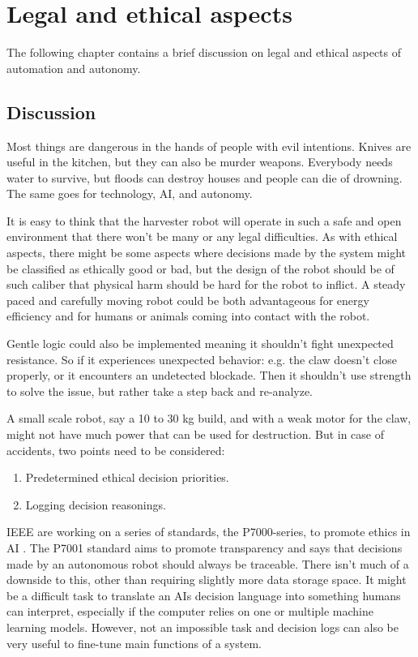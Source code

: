 \documentclass[%
oneside,    %
project,    %
nosummary   %
]{USN-MSc}
\begin{document}
\chapter{Legal and ethical aspects}
\label{ch:legal}
The following chapter contains a brief discussion on legal and ethical aspects of automation and autonomy.

\section{Discussion}
\label{sec:legalEthicalAspects}

Most things are dangerous in the hands of people with evil intentions. Knives are useful in the kitchen,
but they can also be murder weapons. Everybody needs water to survive, but floods can destroy houses and people can die of drowning.
The same goes for technology, AI, and autonomy.

It is easy to think that the harvester robot will operate in such a safe and open environment that there won't be many or any legal difficulties.
As with ethical aspects, there might be some aspects where decisions made by the system might be classified as ethically good or bad,
but the design of the robot should be of such caliber that physical harm should be hard for the robot to inflict. 
A steady paced and carefully moving robot could be both advantageous for energy efficiency and for humans or animals coming into contact with the robot.

Gentle logic could also be implemented meaning it shouldn't fight unexpected resistance. 
So if it experiences unexpected behavior: e.g. the claw doesn't close properly, or it encounters an undetected blockade.
Then it shouldn't use strength to solve the issue, but rather take a step back and re-analyze.

A small scale robot, say a 10 to 30 kg build, and with a weak motor for the claw, might not have much power that can be used for destruction. 
But in case of accidents, two points need to be considered: 
\begin{enumerate}
  \item Predetermined ethical decision priorities.
  \item Logging decision reasonings.
\end{enumerate}

IEEE are working on a series of standards, the P7000-series, to promote ethics in AI \cite{7924235}. 
The P7001 standard aims to promote transparency and says that decisions made by an autonomous robot should always be traceable. There isn't much of a downside to this, other than requiring slightly more data storage space. It might be a difficult task to translate an AIs decision language into something humans can interpret, especially if the computer relies on one or multiple machine learning models. However, not an impossible task and decision logs can also be very useful to fine-tune main functions of a system.
\end{document}
